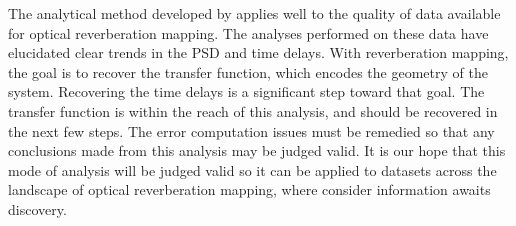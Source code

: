 \documentclass[11pt,letterpaper]{article}
\begin{document}
The analytical method developed by \cite{2013ApJ...777...24Z} applies well to the quality of data available for optical reverberation mapping. The analyses performed on these data have elucidated clear trends in the PSD and time delays. With reverberation mapping, the goal is to recover the transfer function, which encodes the geometry of the system. Recovering the time delays is a significant step toward that goal. The transfer function is within the reach of this analysis, and should be recovered in the next few steps. The error computation issues must be remedied so that any conclusions made from this analysis may be judged valid. It is our hope that this mode of analysis will be judged valid so it can be applied to datasets across the landscape of optical reverberation mapping, where consider information awaits discovery.



\end{document}
